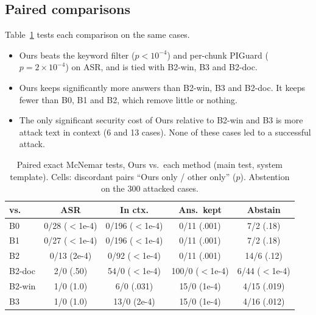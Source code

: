\documentclass[conference]{IEEEtran}
\begin{document}
\subsection{Paired comparisons}
Table~\ref{tab:paired} tests each comparison on the same cases.
\begin{itemize}
\item Ours beats the keyword filter ($p<10^{-4}$) and per-chunk PIGuard
($p=2\times10^{-4}$) on ASR, and is tied with B2-win, B3 and B2-doc.
\item Ours keeps significantly more answers than B2-win, B3 and B2-doc. It
keeps fewer than B0, B1 and B2, which remove little or nothing.
\item The only significant security cost of Ours relative to B2-win and B3
is more attack text in context (6 and 13 cases). None of these cases led to
a successful attack.
\end{itemize}

\begin{table}[t]
\caption{Paired exact McNemar tests, Ours vs.\ each method (main test,
system template). Cells: discordant pairs ``Ours only / other only''
($p$). Abstention on the 300 attacked cases.}
\label{tab:paired}
\centering
\small
\setlength{\tabcolsep}{3pt}
\begin{tabular}{@{}lcccc@{}}
\toprule
vs. & ASR & In ctx. & Ans.\ kept & Abstain \\
\midrule
B0 & 0/28 ($<$1e-4) & 0/196 ($<$1e-4) & 0/11 (.001) & 7/2 (.18) \\
B1 & 0/27 ($<$1e-4) & 0/196 ($<$1e-4) & 0/11 (.001) & 7/2 (.18) \\
B2 & 0/13 (2e-4) & 0/92 ($<$1e-4) & 0/11 (.001) & 14/6 (.12) \\
B2-doc & 2/0 (.50) & 54/0 ($<$1e-4) & 100/0 ($<$1e-4) & 6/44 ($<$1e-4) \\
B2-win & 1/0 (1.0) & 6/0 (.031) & 15/0 (1e-4) & 4/15 (.019) \\
B3 & 1/0 (1.0) & 13/0 (2e-4) & 15/0 (1e-4) & 4/16 (.012) \\
\bottomrule
\end{tabular}
\end{table}
\end{document}
